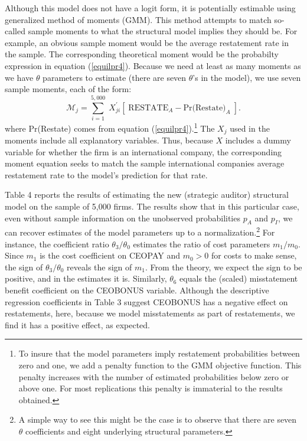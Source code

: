 Although this model does not have a logit form, it is potentially estimable using 
generalized method of moments (GMM). This method attempts to match so-called
sample moments to what the structural model implies they should be. For example,
an obvious sample moment would be the average restatement rate in the sample.
The corresponding theoretical moment would be the probabilty expression
in equation (\ref{equilpr4}). Because we need at least as many moments as
we have $\theta$ parameters to estimate (there are seven $\theta$'s in the model),
we use seven sample moments, each of the form:
$$ \mathcal{M}_j = \sum_{i=1}^{5,000} \; X_{ji}^\prime\left[\; \mbox{RESTATE}_A - \mbox{Pr(Restate)}_A \; \right]. $$
where Pr(Restate) comes from equation (\ref{equilpr4}).\footnote{To insure that the model parameters imply restatement probabilities
between zero and one, we add a penalty function to the GMM objective function.
This penalty increases with the number of estimated probabilities below zero or
above one. For most replications this penalty is immaterial to the results obtained.} The $X_j$ used in the moments include all explanatory variables. Thus, because $X$ includes  a dummy variable for whether the firm is an international company, the corresponding moment equation seeks to match the sample international companies average restatement rate to the model's prediction for that rate.

Table 4 reports the results of estimating the new (strategic auditor) structural model on 
the sample of 5,000 firms. The results show that in this particular case, even without sample information on the unobserved probabilities $p_A$ and 
$p_I$, we can recover estimates of the model parameters up to a normalization.\footnote{A simple way to
see this might be the case is to observe that there are seven $\theta$ coefficients and eight underlying structural parameters.}
For instance, the coefficient ratio $\theta_3/\theta_0$ estimates the ratio of cost parameters $m_1/m_0$. Since $m_1$ is the cost coefficient on CEOPAY and $m_0>0$
for costs to make sense, the sign of $\theta_3/\theta_0$ reveals the sign of $m_1$.
From the theory, we expect the sign to be positive, and in the estimates it is. Similarly,
$\theta_6$ equals the (scaled) misstatement benefit coefficient on the CEOBONUS variable.
Although the descriptive regression coefficients in Table 3 suggest CEOBONUS has a
negative effect on restatements, here, because we model misstatements as part of
restatements, we find it has a positive effect, as expected.

